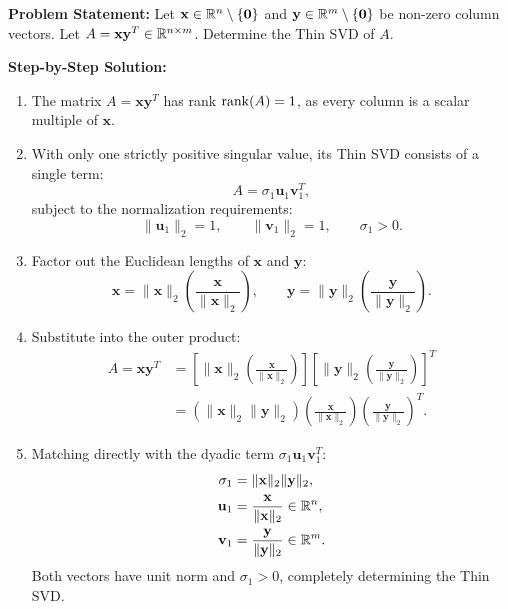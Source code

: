 \begin{example}[Thin SVD of a Rank-1 Outer Product $A = \mathbf{x} \mathbf{y}^T$]
\textbf{Problem Statement:} Let $\mathbf{x} \in \mathbb{R}^n \setminus \{\mathbf{0}\}$ and $\mathbf{y} \in \mathbb{R}^m \setminus \{\mathbf{0}\}$ be non-zero column vectors. Let $A = \mathbf{x} \mathbf{y}^T \in \mathbb{R}^{n \times m}$. Determine the Thin SVD of $A$.

\medskip
\textbf{Step-by-Step Solution:}
\begin{enumerate}
    \item The matrix $A = \mathbf{x} \mathbf{y}^T$ has rank $\operatorname{rank}(A) = 1$, as every column is a scalar multiple of $\mathbf{x}$.
    \item With only one strictly positive singular value, its Thin SVD consists of a single term:
    \begin{equation}
        A = \sigma_1 \mathbf{u}_1 \mathbf{v}_1^T,
    \end{equation}
    subject to the normalization requirements:
    \begin{equation}
        \|\mathbf{u}_1\|_2 = 1, \qquad \|\mathbf{v}_1\|_2 = 1, \qquad \sigma_1 > 0.
    \end{equation}
    \item Factor out the Euclidean lengths of $\mathbf{x}$ and $\mathbf{y}$:
    \begin{equation}
        \mathbf{x} = \|\mathbf{x}\|_2 \left( \frac{\mathbf{x}}{\|\mathbf{x}\|_2} \right), \qquad \mathbf{y} = \|\mathbf{y}\|_2 \left( \frac{\mathbf{y}}{\|\mathbf{y}\|_2} \right).
    \end{equation}
    \item Substitute into the outer product:
    \begin{align}
        A = \mathbf{x} \mathbf{y}^T &= \left[ \|\mathbf{x}\|_2 \left( \frac{\mathbf{x}}{\|\mathbf{x}\|_2} \right) \right] \left[ \|\mathbf{y}\|_2 \left( \frac{\mathbf{y}}{\|\mathbf{y}\|_2} \right) \right]^T \nonumber \\
        &= \left( \|\mathbf{x}\|_2 \|\mathbf{y}\|_2 \right) \left( \frac{\mathbf{x}}{\|\mathbf{x}\|_2} \right) \left( \frac{\mathbf{y}}{\|\mathbf{y}\|_2} \right)^T.
    \end{align}
    \item Matching directly with the dyadic term $\sigma_1 \mathbf{u}_1 \mathbf{v}_1^T$:
    \begin{align}
        \sigma_1 &= \|\mathbf{x}\|_2 \|\mathbf{y}\|_2, \\
        \mathbf{u}_1 &= \frac{\mathbf{x}}{\|\mathbf{x}\|_2} \in \mathbb{R}^n, \\
        \mathbf{v}_1 &= \frac{\mathbf{y}}{\|\mathbf{y}\|_2} \in \mathbb{R}^m.
    \end{align}
    Both vectors have unit norm and $\sigma_1 > 0$, completely determining the Thin SVD.
\end{enumerate}
\end{example}

